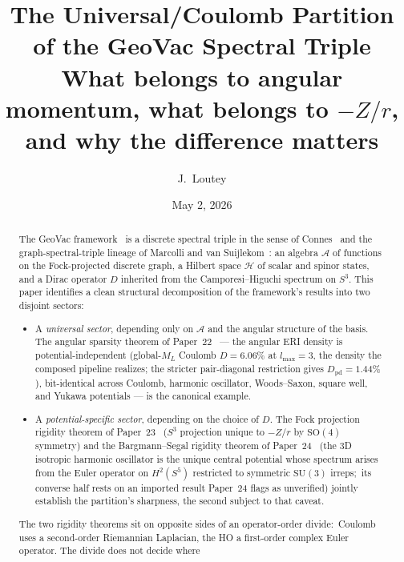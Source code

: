 \documentclass[twocolumn,pra,amsmath,amssymb,superscriptaddress]{revtex4-2}
\begin{document}
\title{The Universal/Coulomb Partition of the GeoVac Spectral Triple\\
{\large What belongs to angular momentum, what belongs to $-Z/r$,\\
and why the difference matters}}

\author{J.~Loutey}

\date{May 2, 2026}

\begin{abstract}
The GeoVac framework~\cite{paper7,paper14} is a discrete spectral
triple in the sense of Connes~\cite{connes_book1994} and the
graph-spectral-triple lineage of Marcolli and van
Suijlekom~\cite{marcolli_vs2014}: an algebra $\mathcal{A}$ of
functions on the Fock-projected discrete graph, a Hilbert space
$\mathcal{H}$ of scalar and spinor states, and a Dirac operator $D$
inherited from the Camporesi--Higuchi spectrum on $S^3$.  This paper
identifies a clean structural decomposition of the framework's
results into two disjoint sectors:
\begin{itemize}
\item A \emph{universal sector}, depending only on $\mathcal{A}$ and
  the angular structure of the basis.  The angular sparsity theorem
  of Paper~22~\cite{paper22} --- the angular ERI density is
  potential-independent (global-$M_L$ Coulomb $D=6.06\%$ at $l_{\max}=3$,
  the density the composed pipeline realizes; the stricter pair-diagonal
  restriction gives $D_{\mathrm{pd}}=1.44\%$), bit-identical across
  Coulomb, harmonic oscillator, Woods--Saxon, square well, and Yukawa
  potentials --- is the canonical example.
\item A \emph{potential-specific sector}, depending on the choice
  of $D$.  The Fock projection rigidity theorem of
  Paper~23~\cite{paper23} ($S^3$ projection unique to $-Z/r$ by
  $\mathrm{SO}(4)$ symmetry) and the Bargmann--Segal rigidity
  theorem of Paper~24~\cite{paper24} (the 3D isotropic harmonic
  oscillator is the unique central potential whose spectrum arises
  from the Euler operator on $H^2(S^5)$ restricted to symmetric
  $\mathrm{SU}(3)$ irreps;\ its converse half rests on an imported
  result Paper~24 flags as unverified) jointly establish the
  partition's sharpness, the second subject to that caveat.
\end{itemize}
The two rigidity theorems sit on opposite sides of an operator-order
divide:\ Coulomb uses a second-order Riemannian Laplacian, the HO a
first-order complex Euler operator.  The divide does not decide where

\end{abstract}
\end{document}
